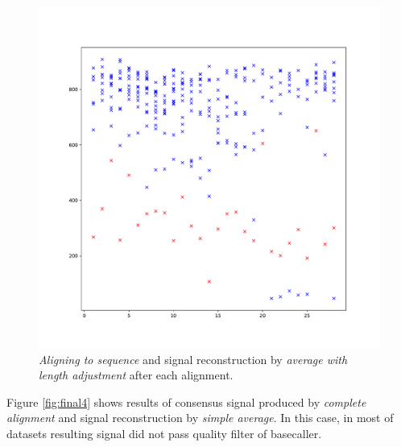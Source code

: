 \begin{figure}[h]
  \centering
  \includegraphics[width=1.0\textwidth]{images/final6}
  \caption{\textit{Aligning to sequence} and signal reconstruction by \textit{average with length adjustment} after each alignment.}
  \label{fig:final6}
\end{figure}

Figure \ref{fig:final4} shows results of consensus signal produced by \textit{complete alignment} and 
signal reconstruction by \textit{simple average}. In this case, in most of datasets resulting signal did not pass 
quality filter of basecaller.

